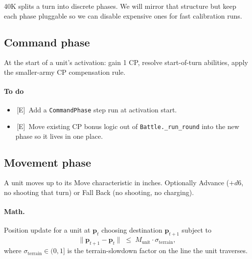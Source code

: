 \documentclass[11pt,a4paper]{article}
\newcommand{\eddie}{\textcolor{eddieblue}{\textsf{[E]}}}
\newcommand{\todo}{\ding{109}\,}    %
\begin{document}
40K splits a turn into discrete phases. We will mirror that structure
but keep each phase pluggable so we can disable expensive ones for fast
calibration runs.

\subsection{Command phase}
At the start of a unit's activation: gain 1 CP, resolve start-of-turn
abilities, apply the smaller-army CP compensation rule.

\paragraph{To do}
\begin{itemize}[label={},leftmargin=*,itemsep=2pt]
  \item \todo \eddie\ Add a \texttt{CommandPhase} step run at activation
    start.
  \item \todo \eddie\ Move existing CP bonus logic out of
    \texttt{Battle.\_run\_round} into the new phase so it lives in one
    place.
\end{itemize}

\subsection{Movement phase}
A unit moves up to its Move characteristic in inches. Optionally Advance
($+d6$, no shooting that turn) or Fall Back (no shooting, no charging).

\paragraph{Math.} Position update for a unit at $\mathbf{p}_t$ choosing
destination $\mathbf{p}_{t+1}$ subject to
\[
  \lVert \mathbf{p}_{t+1} - \mathbf{p}_t \rVert
  \;\leq\; M_{\text{unit}} \cdot \sigma_{\text{terrain}},
\]
where $\sigma_{\text{terrain}} \in (0,1]$ is the terrain-slowdown factor
on the line the unit traverses.
\end{document}
